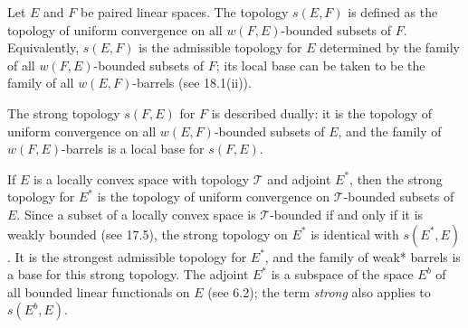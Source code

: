 Let $E$ and $F$ be paired linear spaces. The topology $s(E, F)$ is defined as the topology of uniform convergence on all $w(F, E)$-bounded subsets of $F$. Equivalently, $s(E, F)$ is the admissible topology for $E$ determined by the family of all $w(F, E)$-bounded subsets of $F$; its local base can be taken to be the family of all $w(E, F)$-barrels (see 18.1(ii)).

The strong topology $s(F, E)$ for $F$ is described dually: it is the topology of uniform convergence on all $w(E, F)$-bounded subsets of $E$, and the family of $w(F, E)$-barrels is a local base for $s(F, E)$.

If $E$ is a locally convex space with topology $\mathcal{T}$ and adjoint $E^*$, then the strong topology for $E^*$ is the topology of uniform convergence on $\mathcal{T}$-bounded subsets of $E$. Since a subset of a locally convex space is $\mathcal{T}$-bounded if and only if it is weakly bounded (see 17.5), the strong topology on $E^*$ is identical with $s(E^*, E)$. It is the strongest admissible topology for $E^*$, and the family of weak* barrels is a base for this strong topology. The adjoint $E^*$ is a subspace of the space $E^b$ of all bounded linear functionals on $E$ (see 6.2); the term \textit{strong} also applies to $s(E^b, E)$.
